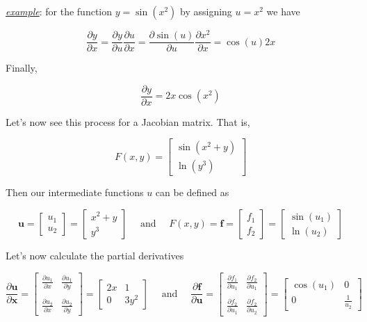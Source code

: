 \documentclass[a4paper,10pt]{article}
\begin{document}
\textit{\underline{example}}: for the function $y = \sin(x^2)$ by assigning $u = x^2$ we have

$$ 
   \frac{\partial y}{\partial x} = \frac{\partial y}{\partial u} \frac{\partial u}{\partial x} = \frac{\partial \sin(u)}{\partial u} \frac{\partial x^2}{\partial x} = \cos(u) 2x
$$

Finally, 

$$ 
   \frac{\partial y}{\partial x} = 2x\cos(x^2)
$$

Let's now see this process for a Jacobian matrix. That is, 

$$
F(x, y) = \begin{bmatrix}
\sin(x^2 + y) \\
\ln(y^3)
\end{bmatrix}
$$

Then our intermediate functions $u$ can be defined as 

$$
\bm{u} = \begin{bmatrix}
    u_1\\
    u_2
\end{bmatrix} = \begin{bmatrix}
    x^2 + y \\
    y^3
\end{bmatrix} \quad \text{ and } \quad
F(x, y) = \bm{f} = \begin{bmatrix}
    f_1\\
    f_2
\end{bmatrix} = \begin{bmatrix}
    \sin(u_1) \\
    \ln(u_2)
    \end{bmatrix}
$$

Let's now calculate the partial derivatives

$$
\frac{\partial \bm{u}}{\partial \bm{x}} = \begin{bmatrix}
    \frac{\partial u_1}{\partial x} & \frac{\partial u_1}{\partial y} \\
    &\\
    \frac{\partial u_2}{\partial x} & \frac{\partial u_2}{\partial y}
\end{bmatrix} = \begin{bmatrix}
    2x & 1 \\
    0 & 3y^2
\end{bmatrix} \quad \text{ and } \quad
\frac{\partial \bm{f}}{\partial \bm{u}} = \begin{bmatrix}
    \frac{\partial f_1}{\partial u_1} & \frac{\partial f_2}{\partial u_1} \\
    &\\
    \frac{\partial f_2}{\partial u_1} & \frac{\partial f_2}{\partial u_2}
\end{bmatrix} = \begin{bmatrix}
    \cos(u_1) & 0 \\
    0 & \frac{1}{u_2}
\end{bmatrix}
$$
\end{document}
